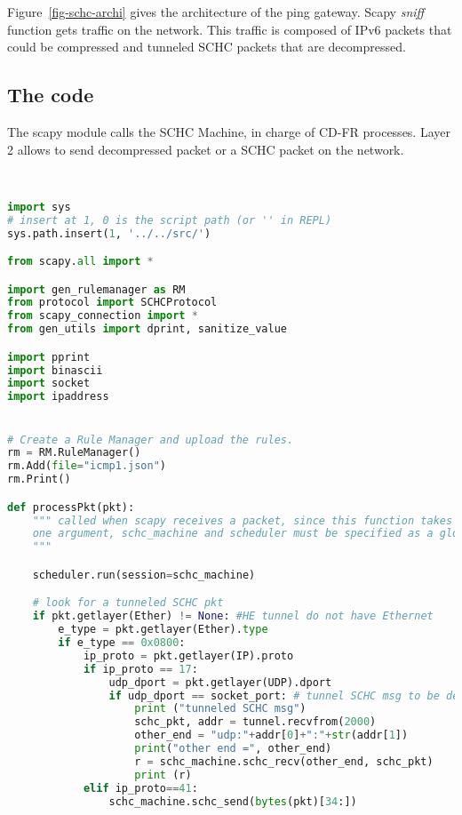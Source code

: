 \documentclass[onecolumn,12pt]{book}
\newcounter{c}
\begin{document}
Figure~\vref{fig-schc-archi} gives the architecture of the ping gateway. 
Scapy \textit{sniff} function gets traffic on the network. 
This traffic is composed of IPv6 packets that could be compressed and tunneled SCHC packets that are decompressed. 

\subsection{The code}
\label{sec:compr_code}

The scapy module calls the SCHC Machine, in charge of CD-FR processes. Layer 2 allows to send decompressed packet or a SCHC packet on the network. 

~~
\begin{lstlisting}[language=Python, basicstyle=\ttfamily\scriptsize, caption={Program ping\_core1.py}, label=prog-ping-core1]
import sys
# insert at 1, 0 is the script path (or '' in REPL)
sys.path.insert(1, '../../src/')

from scapy.all import *

import gen_rulemanager as RM
from protocol import SCHCProtocol
from scapy_connection import *
from gen_utils import dprint, sanitize_value

import pprint
import binascii
import socket
import ipaddress


# Create a Rule Manager and upload the rules.
rm = RM.RuleManager()
rm.Add(file="icmp1.json")
rm.Print()

def processPkt(pkt):
    """ called when scapy receives a packet, since this function takes only 
    one argument, schc_machine and scheduler must be specified as a global variable.
    """

    scheduler.run(session=schc_machine)

    # look for a tunneled SCHC pkt
    if pkt.getlayer(Ether) != None: #HE tunnel do not have Ethernet
        e_type = pkt.getlayer(Ether).type
        if e_type == 0x0800:
            ip_proto = pkt.getlayer(IP).proto
            if ip_proto == 17:
                udp_dport = pkt.getlayer(UDP).dport
                if udp_dport == socket_port: # tunnel SCHC msg to be decompressed
                    print ("tunneled SCHC msg")                    
                    schc_pkt, addr = tunnel.recvfrom(2000)
                    other_end = "udp:"+addr[0]+":"+str(addr[1])
                    print("other end =", other_end)
                    r = schc_machine.schc_recv(other_end, schc_pkt)
                    print (r)
            elif ip_proto==41:
                schc_machine.schc_send(bytes(pkt)[34:])


\end{lstlisting}
\end{document}
